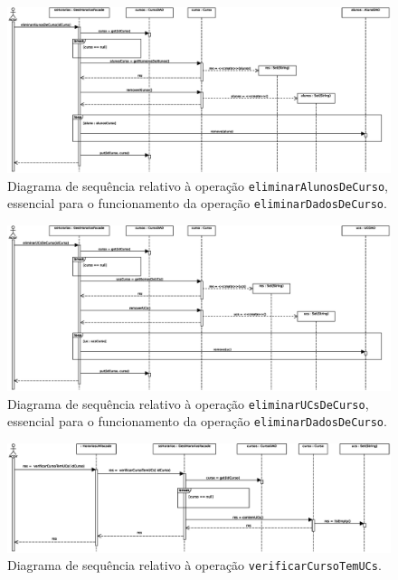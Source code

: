 \documentclass[12pt, a4paper]{article}
\begin{document}
\begin{landscape}
        \begin{figure}[H]
            \centering
            \includegraphics[scale=0.70]{Imagens/Modelos/eliminarAlunosDeCursoDAO.svg.eps}
            \caption{
                Diagrama de sequência relativo à operação \texttt{eliminarAlunosDeCurso}, essencial
                para o funcionamento da operação \texttt{eliminarDadosDeCurso}.
            }
        \end{figure}

        \vspace*{\fill}
        \pagebreak
        \vspace*{\fill}

        \begin{figure}[H]
            \centering
            \includegraphics[scale=0.70]{Imagens/Modelos/eliminarUCsDeCursoDAO.svg.eps}
            \caption{
                Diagrama de sequência relativo à operação \texttt{eliminarUCsDeCurso}, essencial
                para o funcionamento da operação \texttt{eliminarDadosDeCurso}.
            }
        \end{figure}

        \vspace*{\fill}
        \pagebreak
        \vspace*{\fill}

        \begin{figure}[H]
            \centering
            \includegraphics[scale=0.75]{Imagens/Modelos/verificarCursoTemUCsDAO.svg.eps}
            \caption{
                Diagrama de sequência relativo à operação \texttt{verificarCursoTemUCs}.
            }
        \end{figure}


\end{landscape}
\end{document}
